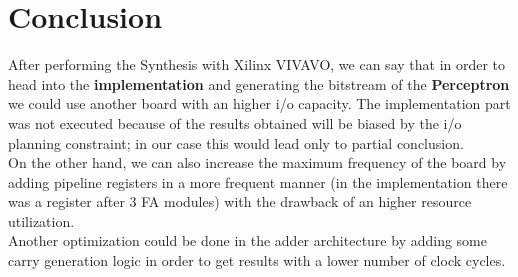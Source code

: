 \section{Conclusion}
After performing the Synthesis with Xilinx VIVAVO, we can say that in order to head into the \textbf{implementation} and generating the bitstream of the \textbf{Perceptron} we could use another board with an higher i/o capacity. The implementation part was not executed because of the results obtained will be biased by the i/o planning constraint; in our case this would lead only to partial conclusion.\\
On the other hand, we can also increase the maximum frequency of the board by adding pipeline registers in a more frequent manner (in the implementation there was a register after 3 FA modules) with the drawback of an higher resource utilization.\\
Another optimization could be done in the adder architecture by adding some carry generation logic in order to get results with a lower number of clock cycles.